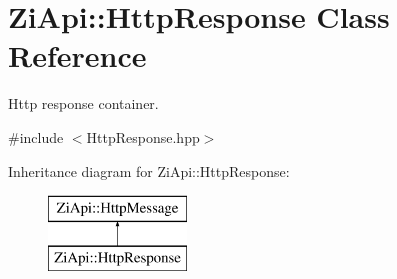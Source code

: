 \hypertarget{classZiApi_1_1HttpResponse}{}\section{Zi\+Api\+::Http\+Response Class Reference}
\label{classZiApi_1_1HttpResponse}


Http response container.  




{\ttfamily \#include $<$Http\+Response.\+hpp$>$}

Inheritance diagram for Zi\+Api\+::Http\+Response\+:\begin{figure}[H]
\begin{center}
\leavevmode
\includegraphics[height=2.000000cm]{classZiApi_1_1HttpResponse}
\end{center}
\end{figure}
